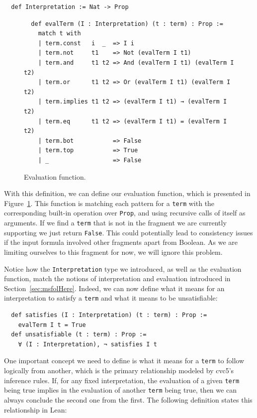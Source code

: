 \begin{verbatim}
  def Interpretation := Nat -> Prop
\end{verbatim}


\begin{figure}[t]
\begin{verbatim}
  def evalTerm (I : Interpretation) (t : term) : Prop :=
    match t with
    | term.const   i  _  => I i
    | term.not     t1    => Not (evalTerm I t1)
    | term.and     t1 t2 => And (evalTerm I t1) (evalTerm I t2)
    | term.or      t1 t2 => Or (evalTerm I t1) (evalTerm I t2)
    | term.implies t1 t2 => (evalTerm I t1) → (evalTerm I t2)
    | term.eq      t1 t2 => (evalTerm I t1) = (evalTerm I t2)
    | term.bot           => False
    | term.top           => True
    | _                  => False
\end{verbatim}
\caption{Evaluation function.}\label{evalTerm1}
\end{figure}

With this definition, we can define our evaluation function, which is presented in
Figure~\ref{evalTerm1}.
This function is matching each pattern for a \texttt{term} with the corresponding built-in operation over \texttt{Prop}, and using recursive calls of itself as arguments. If we find a \texttt{term} that is not in the fragment we are currently supporting we just return \texttt{False}. This could potentially lead to consistency issues if the input formula involved other fragments apart from Boolean. As we are limiting ourselves to this fragment for now, we will ignore this problem.

Notice how the \texttt{Interpretation} type we introduced, as well as the evaluation function, match the notions of interpretation and evaluation introduced in Section~\ref{sec:msfolHere}. Indeed, we can now define what it means for an interpretation to satisfy a \texttt{term} and what it means to be unsatisfiable:

\begin{verbatim}
  def satisfies (I : Interpretation) (t : term) : Prop :=
    evalTerm I t = True
  def unsatisfiable (t : term) : Prop :=
    ∀ (I : Interpretation), ¬ satisfies I t
\end{verbatim}

One important concept we need to define is what it means for a \texttt{term}
to follow logically from another, which is the primary relationship modeled
by cvc5's inference rules.
%
If, for any fixed interpretation, the evaluation of a given \texttt{term} being true
implies in the evaluation of another \texttt{term} being true, then we can always
conclude the second one from the first. The following definition states this
relationship in Lean:

